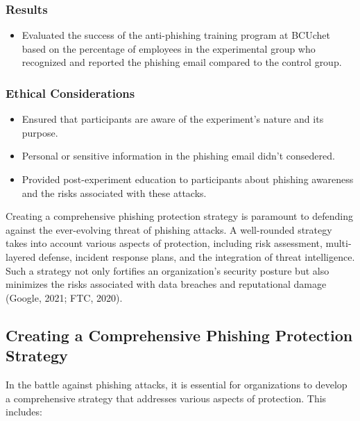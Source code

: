 \documentclass[conference]{IEEEtran}
\begin{document}
\subsubsection{Results}
\begin{itemize}
    \item Evaluated the success of the anti-phishing training program at BCUchet based on the percentage of employees in the experimental group who recognized and reported the phishing email compared to the control group.
\end{itemize}

\subsubsection{Ethical Considerations}
\begin{itemize}
    \item Ensured that participants are aware of the experiment's nature and its purpose.
    \item Personal or sensitive information in the phishing email didn’t consedered.
    \item Provided post-experiment education to participants about phishing awareness and the risks associated with these attacks.
\end{itemize}

Creating a comprehensive phishing protection strategy is paramount to defending against the ever-evolving threat of phishing attacks. A well-rounded strategy takes into account various aspects of protection, including risk assessment, multi-layered defense, incident response plans, and the integration of threat intelligence. Such a strategy not only fortifies an organization's security posture but also minimizes the risks associated with data breaches and reputational damage (Google, 2021; FTC, 2020).

\subsection{Creating a Comprehensive Phishing Protection Strategy}
In the battle against phishing attacks, it is essential for organizations to develop a comprehensive strategy that addresses various aspects of protection. This includes:
\end{document}
